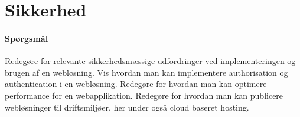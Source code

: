 \section{Sikkerhed}

\paragraph{Spørgsmål}
Redegøre for relevante sikkerhedsmæssige udfordringer ved implementeringen og brugen af en webløsning.	Vis hvordan man kan implementere authorisation og authentication i en webløsning.	Redegøre for hvordan man kan optimere performance for en webapplikation. Redegøre for hvordan man kan publicere webløsninger til driftsmiljøer, her under også cloud baseret hosting.
